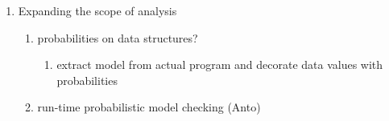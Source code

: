 \begin{enumerate}
   \item Expanding the scope of analysis
     \begin{enumerate}
      \item probabilities on data structures?
        \begin{enumerate}
         \item extract model from actual program and decorate data
               values with probabilities
        \end{enumerate}
      \item run-time probabilistic model checking (Anto)
     \end{enumerate}

  \end{enumerate}
